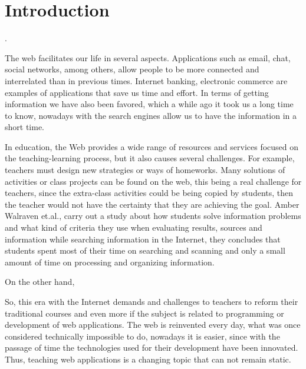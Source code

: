 \section{Introduction}
\label{sec:intro}

 \cite{cabada2018affective}.

The web facilitates our life in several aspects. Applications such as email, chat, social networks, among others, allow people to be more connected and interrelated than in previous times. Internet banking, electronic commerce are examples of applications that save us time and effort. In terms of getting 
information we have also been favored, which a while ago it took us a long time to know, nowadays with the search engines allow us to have the information in a short time. 

In education, the Web provides a wide range of resources and services focused on the teaching-learning process, but it also causes several challenges. For example, %
teachers must design new strategies or ways of homeworks.
Many solutions of activities or class projects can be found on the web, this being a real challenge for teachers, since the extra-class activities could be being copied by students, then the teacher would not have the certainty that they are achieving the goal. Amber Walraven et.al., \cite{Walraven2009} 
carry out a study about how students solve information problems and what kind of criteria they use 
when evaluating results, sources and information while searching information in 
the Internet, they concludes that students spent most of their time on searching and 
scanning and only a small amount of time on processing and organizing information.

On the other hand, 

So, this era with the Internet demands and challenges to teachers to reform their 
traditional courses and even more if the subject is related to programming or 
development of web applications. The web is reinvented every day, what was once 
considered technically impossible to do, nowadays it is easier, since with the 
passage of time the technologies used for their development have been innovated. 
Thus, teaching web applications is a changing topic that can not remain static.

